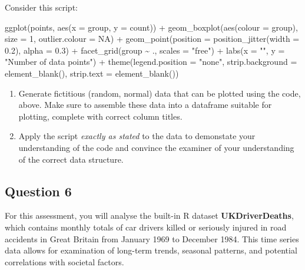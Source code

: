 \documentclass[
  10t,
]{article}
\newenvironment{Shaded}{\begin{snugshade}}{\end{snugshade}}
\newcommand{\AttributeTok}[1]{\textcolor[rgb]{0.40,0.45,0.13}{#1}}
\newcommand{\ConstantTok}[1]{\textcolor[rgb]{0.56,0.35,0.01}{#1}}
\newcommand{\DecValTok}[1]{\textcolor[rgb]{0.68,0.00,0.00}{#1}}
\newcommand{\FloatTok}[1]{\textcolor[rgb]{0.68,0.00,0.00}{#1}}
\newcommand{\FunctionTok}[1]{\textcolor[rgb]{0.28,0.35,0.67}{#1}}
\newcommand{\NormalTok}[1]{\textcolor[rgb]{0.00,0.23,0.31}{#1}}
\newcommand{\SpecialCharTok}[1]{\textcolor[rgb]{0.37,0.37,0.37}{#1}}
\newcommand{\StringTok}[1]{\textcolor[rgb]{0.13,0.47,0.30}{#1}}
\providecommand{\tightlist}{%
  \setlength{\itemsep}{0pt}\setlength{\parskip}{0pt}}\usepackage{longtable,booktabs,array}
\begin{document}
Consider this script:

\begin{Shaded}
\begin{Highlighting}[]
\FunctionTok{ggplot}\NormalTok{(points, }\FunctionTok{aes}\NormalTok{(}\AttributeTok{x =}\NormalTok{ group, }\AttributeTok{y =}\NormalTok{ count)) }\SpecialCharTok{+}
  \FunctionTok{geom\_boxplot}\NormalTok{(}\FunctionTok{aes}\NormalTok{(}\AttributeTok{colour =}\NormalTok{ group), }\AttributeTok{size =} \DecValTok{1}\NormalTok{, }\AttributeTok{outlier.colour =} \ConstantTok{NA}\NormalTok{) }\SpecialCharTok{+}
  \FunctionTok{geom\_point}\NormalTok{(}\AttributeTok{position =} \FunctionTok{position\_jitter}\NormalTok{(}\AttributeTok{width =} \FloatTok{0.2}\NormalTok{), }\AttributeTok{alpha =} \FloatTok{0.3}\NormalTok{) }\SpecialCharTok{+}
  \FunctionTok{facet\_grid}\NormalTok{(group }\SpecialCharTok{\textasciitilde{}}\NormalTok{ ., }\AttributeTok{scales =} \StringTok{"free"}\NormalTok{) }\SpecialCharTok{+}
  \FunctionTok{labs}\NormalTok{(}\AttributeTok{x =} \StringTok{""}\NormalTok{, }\AttributeTok{y =} \StringTok{"Number of data points"}\NormalTok{) }\SpecialCharTok{+}
  \FunctionTok{theme}\NormalTok{(}\AttributeTok{legend.position =} \StringTok{"none"}\NormalTok{,}
    \AttributeTok{strip.background =} \FunctionTok{element\_blank}\NormalTok{(),}
    \AttributeTok{strip.text =} \FunctionTok{element\_blank}\NormalTok{())}
\end{Highlighting}
\end{Shaded}

\begin{enumerate}
\def\labelenumi{\alph{enumi}.}
\tightlist
\item
  Generate fictitious (random, normal) data that can be plotted using
  the code, above. Make sure to assemble these data into a dataframe
  suitable for plotting, complete with correct column titles.
\item
  Apply the script \emph{exactly as stated} to the data to demonstate
  your understanding of the code and convince the examiner of your
  understanding of the correct data structure.
\end{enumerate}

\subsection{Question 6}\label{question-6-1}

For this assessment, you will analyse the built-in R dataset
\textbf{UKDriverDeaths}, which contains monthly totals of car drivers
killed or seriously injured in road accidents in Great Britain from
January 1969 to December 1984. This time series data allows for
examination of long-term trends, seasonal patterns, and potential
correlations with societal factors.
\end{document}
